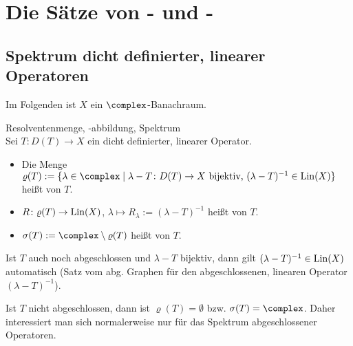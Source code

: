 \section{%
    Die Sätze von - und -%
}

\subsection{%
    Spektrum dicht definierter, linearer Operatoren%
}

\begin{Bem}
    Im Folgenden ist $X$ ein $\complex$-Banachraum.
\end{Bem}

\begin{Def}{Resolventenmenge, -abbildung, Spektrum}\\
    Sei $T\colon D(T) \rightarrow X$ ein dicht definierter, linearer Operator.
    \begin{itemize}
        \item
        Die Menge $\varrho(T) := \{\lambda \in \complex \;|\;
        \text{$\lambda-T\colon D(T) \rightarrow X$ bijektiv, $(\lambda-T)^{-1} \in \Lin(X)$}\}$
        heißt  von $T$.
        
        \item
        $R\colon \varrho(T) \rightarrow \operatorname{Lin}(X)$, $\lambda \mapsto R_\lambda := (\lambda-T)^{-1}$
        heißt  von $T$.
        
        \item
        $\sigma(T) := \complex \setminus \varrho(T)$ heißt  von $T$.
    \end{itemize}
\end{Def}

\begin{Bem}
    Ist $T$ auch noch abgeschlossen und $\lambda - T$ bijektiv, dann gilt
    $(\lambda-T)^{-1} \in \operatorname{Lin}(X)$ automatisch
    (Satz vom abg. Graphen für den abgeschlossenen,
    linearen Operator $(\lambda - T)^{-1}$).
\end{Bem}

\begin{Bem}
    Ist $T$ nicht abgeschlossen, dann ist $\varrho(T) = \emptyset$ bzw. $\sigma(T) = \complex$.
    Daher interessiert man sich normalerweise nur für das Spektrum abgeschlossener Operatoren.
\end{Bem}

\linie

